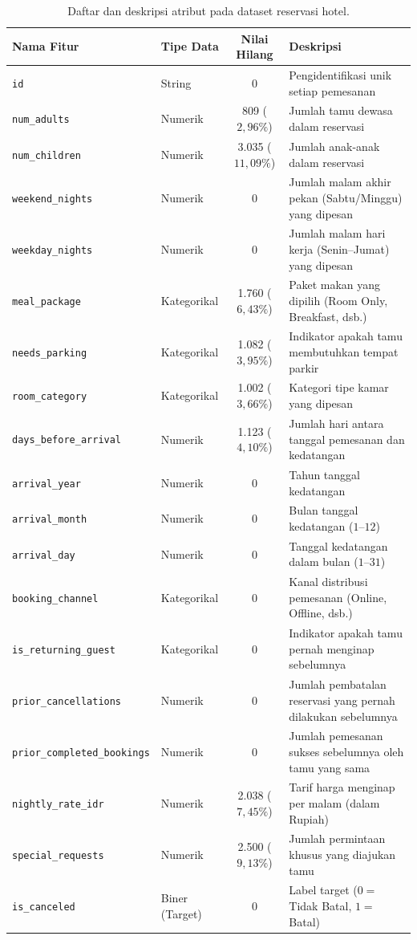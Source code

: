 \begin{table}[htbp]
  \centering
  \caption{Daftar dan deskripsi atribut pada dataset reservasi hotel.}
  \label{tab:deskripsi-fitur}
  \footnotesize
  \begin{tabularx}{\textwidth}{@{}llcX@{}}
    \toprule
    \textbf{Nama Fitur} & \textbf{Tipe Data} & \textbf{Nilai Hilang} & \textbf{Deskripsi} \\
    \midrule
    \texttt{id} & String & 0 & Pengidentifikasi unik setiap pemesanan \\
    \texttt{num\_adults} & Numerik & 809 ($2{,}96\%$) & Jumlah tamu dewasa dalam reservasi \\
    \texttt{num\_children} & Numerik & 3.035 ($11{,}09\%$) & Jumlah anak-anak dalam reservasi \\
    \texttt{weekend\_nights} & Numerik & 0 & Jumlah malam akhir pekan (Sabtu/Minggu) yang dipesan \\
    \texttt{weekday\_nights} & Numerik & 0 & Jumlah malam hari kerja (Senin--Jumat) yang dipesan \\
    \texttt{meal\_package} & Kategorikal & 1.760 ($6{,}43\%$) & Paket makan yang dipilih (Room Only, Breakfast, dsb.) \\
    \texttt{needs\_parking} & Kategorikal & 1.082 ($3{,}95\%$) & Indikator apakah tamu membutuhkan tempat parkir \\
    \texttt{room\_category} & Kategorikal & 1.002 ($3{,}66\%$) & Kategori tipe kamar yang dipesan \\
    \texttt{days\_before\_arrival} & Numerik & 1.123 ($4{,}10\%$) & Jumlah hari antara tanggal pemesanan dan kedatangan \\
    \texttt{arrival\_year} & Numerik & 0 & Tahun tanggal kedatangan \\
    \texttt{arrival\_month} & Numerik & 0 & Bulan tanggal kedatangan ($1$--$12$) \\
    \texttt{arrival\_day} & Numerik & 0 & Tanggal kedatangan dalam bulan ($1$--$31$) \\
    \texttt{booking\_channel} & Kategorikal & 0 & Kanal distribusi pemesanan (Online, Offline, dsb.) \\
    \texttt{is\_returning\_guest} & Kategorikal & 0 & Indikator apakah tamu pernah menginap sebelumnya \\
    \texttt{prior\_cancellations} & Numerik & 0 & Jumlah pembatalan reservasi yang pernah dilakukan sebelumnya \\
    \texttt{prior\_completed\_bookings} & Numerik & 0 & Jumlah pemesanan sukses sebelumnya oleh tamu yang sama \\
    \texttt{nightly\_rate\_idr} & Numerik & 2.038 ($7{,}45\%$) & Tarif harga menginap per malam (dalam Rupiah) \\
    \texttt{special\_requests} & Numerik & 2.500 ($9{,}13\%$) & Jumlah permintaan khusus yang diajukan tamu \\
    \midrule
    \texttt{is\_canceled} & Biner (Target) & 0 & Label target ($0 =$ Tidak Batal, $1 =$ Batal) \\
    \bottomrule
  \end{tabularx}
\end{table}

